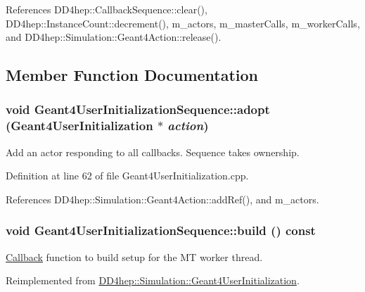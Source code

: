 References DD4hep::CallbackSequence::clear(), DD4hep::InstanceCount::decrement(), m\_\-actors, m\_\-masterCalls, m\_\-workerCalls, and DD4hep::Simulation::Geant4Action::release().

\subsection{Member Function Documentation}
\hypertarget{class_d_d4hep_1_1_simulation_1_1_geant4_user_initialization_sequence_a00f01d23b874b3c99c6877ce01b6b702}{
\subsubsection[{adopt}]{\setlength{\rightskip}{0pt plus 5cm}void Geant4UserInitializationSequence::adopt ({\bf Geant4UserInitialization} $\ast$ {\em action})}}
\label{class_d_d4hep_1_1_simulation_1_1_geant4_user_initialization_sequence_a00f01d23b874b3c99c6877ce01b6b702}


Add an actor responding to all callbacks. Sequence takes ownership. 

Definition at line 62 of file Geant4UserInitialization.cpp.

References DD4hep::Simulation::Geant4Action::addRef(), and m\_\-actors.\hypertarget{class_d_d4hep_1_1_simulation_1_1_geant4_user_initialization_sequence_a2c9eb901f2697c8f9ba428b49b7252ac}{
\subsubsection[{build}]{\setlength{\rightskip}{0pt plus 5cm}void Geant4UserInitializationSequence::build () const}}
\label{class_d_d4hep_1_1_simulation_1_1_geant4_user_initialization_sequence_a2c9eb901f2697c8f9ba428b49b7252ac}


\hyperlink{class_d_d4hep_1_1_callback}{Callback} function to build setup for the MT worker thread. 

Reimplemented from \hyperlink{class_d_d4hep_1_1_simulation_1_1_geant4_user_initialization_a6313dbf2fcee89a5a9cb60d3cef4ba45}{DD4hep::Simulation::Geant4UserInitialization}.


